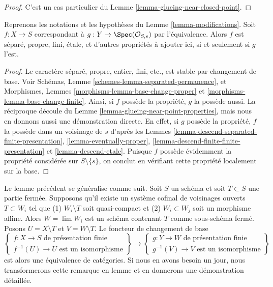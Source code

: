 \begin{proof}
C'est un cas particulier du Lemme \ref{lemma-glueing-near-closed-point}.
\end{proof}

\begin{lemma}
\label{lemma-modifications-properties}
Reprenons les notations et les hypothèses du Lemme \ref{lemma-modifications}.
Soit $f : X \to S$ correspondant à $g : Y \to \Spec(\mathcal{O}_{S, s})$
par l'équivalence. Alors $f$ est séparé, propre, fini, \'etale,
et d'autres propriétés à ajouter ici, si et seulement si $g$ l'est.
\end{lemma}

\begin{proof}
Le caractère séparé, propre, entier, fini, etc.,
est stable par changement de base. Voir
Schémas, Lemme \ref{schemes-lemma-separated-permanence},
et
Morphismes, Lemmes \ref{morphisms-lemma-base-change-proper} et
\ref{morphisms-lemma-base-change-finite}.
Ainsi, si $f$ possède la propriété, $g$ la possède aussi.
La réciproque découle du Lemme \ref{lemma-glueing-near-point-properties},
mais nous en donnons aussi une démonstration directe.
En effet, si $g$ possède la propriété, $f$ la possède dans un voisinage de $s$ d'après les
Lemmes \ref{lemma-descend-separated-finite-presentation},
\ref{lemma-eventually-proper},
\ref{lemma-descend-finite-finite-presentation} et
\ref{lemma-descend-etale}.
Puisque $f$ possède évidemment la propriété considérée sur $S \setminus \{s\}$,
on conclut en vérifiant cette propriété localement sur la base.
\end{proof}

\begin{remark}
\label{remark-more-general-modification}
Le lemme précédent se généralise comme suit. Soit $S$ un schéma et
soit $T \subset S$ une partie fermée. Supposons qu'il existe un système cofinal
de voisinages ouverts $T \subset W_i$ tel que
(1) $W_i \setminus T$ soit quasi-compact et
(2) $W_i \subset W_j$ soit un morphisme affine.
Alors $W = \lim W_i$ est un schéma contenant $T$
comme sous-schéma fermé. Posons $U = X \setminus T$ et $V = W \setminus T$.
Le foncteur de changement de base
$$
\left\{
\begin{matrix}
f : X \to S\text{ de présentation finie} \\
f^{-1}(U) \to U\text{ est un isomorphisme}
\end{matrix}
\right\}
\longrightarrow
\left\{
\begin{matrix}
g : Y \to W\text{ de présentation finie} \\
g^{-1}(V) \to V\text{ est un isomorphisme}
\end{matrix}
\right\}
$$
est alors une équivalence de catégories. Si nous en avons besoin un jour,
nous transformerons cette remarque en lemme et en donnerons une démonstration détaillée.
\end{remark}

